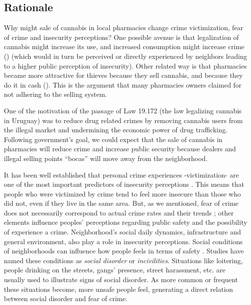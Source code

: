 \documentclass[11pt]{article}
\begin{document}
\subsection{Rationale}
Why might sale of cannabis in local pharmacies change crime victimization, fear of crime and insecurity perceptions? One possible avenue is that legalization of cannabis might increase its use, and increased consumption might increase crime (\cite{pacula2003marijuana}) (which would in turn be perceived or directly experienced by neighbors leading to a higher public perception of insecurity). Other related way is that pharmacies became more attractive for thieves because they sell cannabis, and because they do it in cash (\cite{hunt2018high}). This is the argument that many pharmacies owners claimed for not adhering to the selling system.

One of the motivation of the passage of Law 19.172 (the law legalizing cannabis in Uruguay) was to reduce drug related crimes by removing cannabis users from the illegal market and undermining the economic power of drug trafficking. Following government's goal, we could expect that the sale of cannabis in pharmacies will reduce crime and increase public security because dealers and illegal selling points ``bocas'' will move away from the neighborhood.

It has been well established that personal crime experiences -victimization- are one of the most important predictors of insecurity perceptions \citep{cruz2009public}. This means that people who were victimized by crime tend to feel more insecure than those who did not, even if they live in the same area. But, as we mentioned, fear of crime does not necessarily correspond to actual crime rates and their trends \citep{wong2012bringing}; other elements influence peoples' perceptions regarding public safety and the possibility of experience a crime. Neighborhood's social daily dynamics, infrastructure and general environment, also play a role in insecurity perceptions. Social conditions of neighborhoods can influence how people feels in terms of safety \citep{cruz2009public, brunton2011neighborhoods, valera2014perceived}. Studies have named these conditions as \textit{social disorder} or \textit{incivilities}. Situations like loitering, people drinking on the streets, gangs' presence, street harassment, etc. \citep{bennett1994determinants, valera2014perceived} are usually used to illustrate signs of social disorder. As more common or frequent these situations become, more unsafe people feel, generating a direct relation between social disorder and fear of crime.
\end{document}

